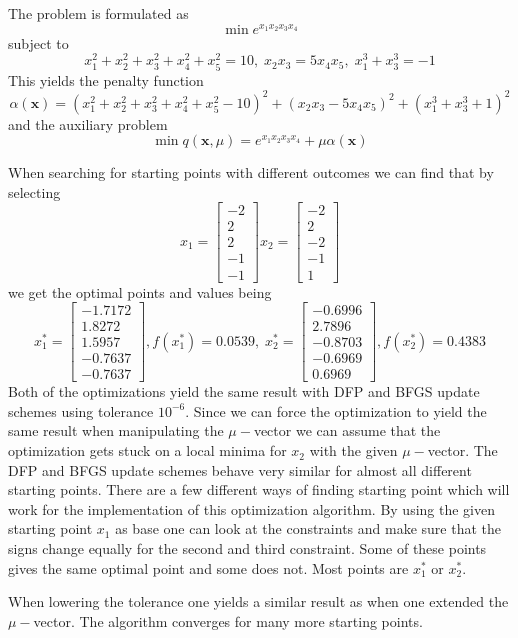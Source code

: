 
The problem is formulated as 
$$\min e^{x_1 x_2 x_3 x_4} $$ subject to $$x_1^2 + x_2^2 + x_3^2 + x_4^2 + x_5^2 = 10,\; x_2 x_3 = 5 x_4 x_5,\;x_1^3 + x_3^3 = -1$$
This yields the penalty function $$\alpha(\textbf{x}) = (x_1^2 + x_2^2 + x_3^2 + x_4^2 + x_5^2 - 10)^2+(x_2 x_3 - 5 x_4 x_5)^2 + (x_1^3 + x_3^3 +1)^2$$ and the auxiliary problem
$$\min q(\textbf{x},\mu) =  e^{x_1 x_2 x_3 x_4} + \mu\alpha(\textbf{x})$$

When searching for starting points with different outcomes we can find that by selecting 
$$x_1=\left[
\begin{array}{c}
-2\\2\\2\\-1\\-1
\end{array}
\right] x_2 =\left[
\begin{array}{c}
-2\\2\\-2\\-1\\1
\end{array}
\right] $$ we get the optimal points and values being $$x_1^*=
\left[
\begin{array}{c}
-1.7172\\1.8272\\1.5957\\-0.7637\\-0.7637
\end{array}
\right], f(x_1^*)=0.0539, \;x_2^* = \left[
\begin{array}{c}
-0.6996\\ 2.7896\\-0.8703\\-0.6969\\0.6969
\end{array}
\right],f(x_2^*)=0.4383$$
Both of the optimizations yield the same result with DFP and BFGS update schemes using tolerance $10^{-6}$. Since we can force the optimization to yield the same result when manipulating the $\mu-$vector we can assume that the optimization gets stuck on a local minima for $x_2$ with the given $\mu-$vector. The DFP and BFGS update schemes behave very similar for almost all different starting points. There are a few different ways of finding starting point which will work for the implementation of this optimization algorithm. By using the given starting point $x_1$ as base one can look at the constraints and make sure that the signs change equally for the second and third constraint. Some of these points gives the same optimal point and some does not. Most points are $x_1^*$ or $x_2^*$. 

When lowering the tolerance one yields a similar result as when one extended the $\mu-$vector. The algorithm converges for many more starting points.



